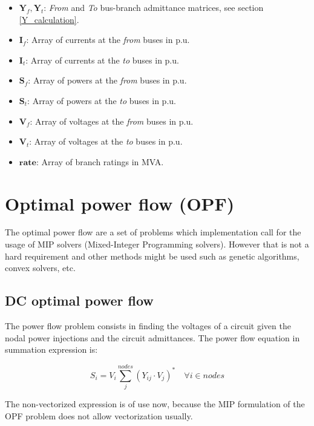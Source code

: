 \documentclass[nols,a4paper,twoside,notoc,fleqn]{tufte-book}
\begin{document}
\begin{itemize}
	\item $\textbf{Y}_f, \textbf{Y}_t$: \textit{From} and \textit{To} bus-branch admittance matrices, see section \ref{Y_calculation}.
	\item $\textbf{I}_f$: Array of currents at the \textit{from} buses in p.u.
	\item $\textbf{I}_t$: Array of currents at the \textit{to} buses in p.u.
	\item $\textbf{S}_f$: Array of powers at the \textit{from} buses in p.u.
	\item $\textbf{S}_t$: Array of powers at the \textit{to} buses in p.u.
	\item $\textbf{V}_f$: Array of voltages at the \textit{from} buses in p.u.
	\item $\textbf{V}_t$: Array of voltages at the \textit{to} buses in p.u.
	\item $\textbf{rate}$: Array of branch ratings in MVA.
\end{itemize}



\chapter{Optimal power flow (OPF)}

The optimal power flow are a set of problems which implementation call for the usage of MIP solvers (Mixed-Integer Programming solvers). However that is not a hard requirement and other methods might be used such as genetic algorithms, convex solvers, etc.


\section{DC optimal power flow}

The power flow problem consists in finding the voltages of a circuit given the nodal power injections and the circuit admittances. The power flow equation in summation expression is:

\begin{equation}
S_i=V_i \sum_j^{nodes} \left(Y_{ij} \cdot V_j\right) ^* \quad  \forall i \in nodes
\end{equation}

The non-vectorized expression is of use now, because the MIP formulation of the OPF problem does not allow vectorization usually.
\end{document}
